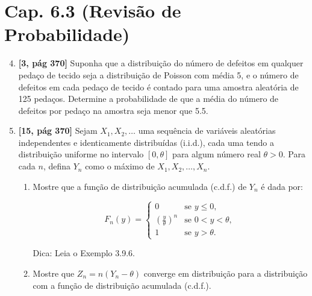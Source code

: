 \documentclass[leqno, 12pt]{article}
\begin{document}
\section*{Cap. 6.3 (Revisão de Probabilidade)}

\begin{enumerate}

\setcounter{enumi}{3}

\item \textbf{[3, pág 370]} Suponha que a distribuição do número de defeitos em qualquer pedaço de tecido seja a distribuição de Poisson com média 5, e o número de defeitos em cada pedaço de tecido é contado para uma amostra aleatória de 125 pedaços. Determine a probabilidade de que a média do número de defeitos por pedaço na amostra seja menor que 5.5.


\item \textbf{[15, pág 370]} Sejam \(X_1, X_2, \ldots\) uma sequência de variáveis aleatórias independentes e identicamente distribuídas (i.i.d.), cada uma tendo a distribuição uniforme no intervalo \([0, \theta]\) para algum número real \(\theta > 0\). Para cada \(n\), defina \(Y_n\) como o máximo de \(X_1, X_2, \ldots, X_n\).

\begin{enumerate}
    \item Mostre que a função de distribuição acumulada (c.d.f.) de \(Y_n\) é dada por:

        \[
        F_n(y) =
        \begin{cases}
        0 & \text{se } y \leq 0, \\
        \left(\frac{y}{\theta}\right)^n & \text{se } 0 < y < \theta, \\
        1 & \text{se } y > \theta.
        \end{cases}
        \]
        
        Dica: Leia o Exemplo 3.9.6.

    \item Mostre que \( Z_n = n(Y_n - \theta) \) converge em distribuição para a distribuição com a função de distribuição acumulada (c.d.f.).


\end{enumerate}
\end{enumerate}
\end{document}
